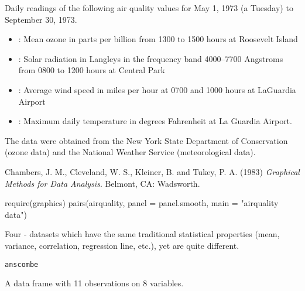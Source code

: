 %
\begin{Details}\relax
Daily readings of the following air quality values for May 1, 1973 (a
Tuesday) to September 30, 1973.

\begin{itemize}

\item {}: Mean ozone in parts per
billion from 1300 to 1500 hours at Roosevelt Island
\item {}: Solar radiation
in Langleys in the frequency band 4000--7700 Angstroms from
0800 to 1200 hours at Central Park
\item {}: Average wind speed in miles
per hour at 0700 and 1000 hours at LaGuardia Airport
\item {}: Maximum daily
temperature in degrees Fahrenheit at La Guardia Airport.

\end{itemize}

\end{Details}
%
\begin{Source}\relax
The data were obtained from the New York State Department of
Conservation (ozone data) and the National Weather Service
(meteorological data).
\end{Source}
%
\begin{References}\relax
Chambers, J. M., Cleveland, W. S., Kleiner, B. and Tukey, P. A. (1983)
\emph{Graphical Methods for Data Analysis}.
Belmont, CA: Wadsworth.
\end{References}
%
\begin{Examples}
\begin{ExampleCode}
require(graphics)
pairs(airquality, panel = panel.smooth, main = "airquality data")
\end{ExampleCode}
\end{Examples}
%
\begin{Description}\relax
Four - datasets which have the same traditional
statistical properties (mean, variance, correlation, regression line,
etc.), yet are quite different.
\end{Description}
%
\begin{Usage}
\begin{verbatim}
anscombe
\end{verbatim}
\end{Usage}
%
\begin{Format}
A data frame with 11 observations on 8 variables.

\end{Format}
